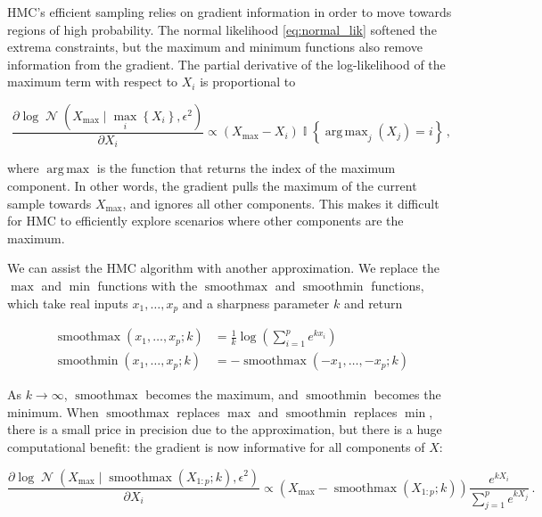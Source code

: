 \documentclass[letter]{article}
\newcommand{\genericdel}[3]{%
      \left#1#3\right#2
    }
\newcommand{\del}[1]{\genericdel(){#1}}
\newcommand{\cbr}[1]{\genericdel\{\}{#1}}
\DeclareMathOperator*{\argmax}{arg\,max}
\DeclareMathOperator{\Ind}{\mathbb{I}}
\DeclareMathOperator{\normal}{\mathcal{N}}
\DeclareMathOperator*{\softmax}{smoothmax}
\DeclareMathOperator*{\softmin}{smoothmin}
\newcommand{\Xmax}{X_{\max}}
\begin{document}
        HMC's efficient sampling relies on gradient information in order to move towards regions of high probability.
The normal likelihood \eqref{eq:normal_lik} softened the extrema constraints,
but the maximum and minimum functions also remove information from the gradient.
The partial derivative of the log-likelihood of the maximum term with respect to \(X_i\) is proportional to

\begin{equation}
\frac{\partial \log \normal\del{\Xmax \mid \max_i\cbr{X_i}, \epsilon^2}}{\partial X_i} \propto \del{\Xmax - X_i} \Ind\cbr{\argmax_j\del{X_j} = i} \,,
\end{equation}

where \(\argmax\) is the function that returns the index of the maximum component.
In other words, the gradient pulls the maximum of the current sample towards \(\Xmax\),
and ignores all other components.
This makes it difficult for HMC to efficiently explore scenarios where other components are the maximum.
    


        We can assist the HMC algorithm with another approximation.
We replace the \(\max\) and \(\min\) functions with the \(\softmax\) and \(\softmin\) functions, which take real inputs \(x_1, \ldots, x_p\) and a sharpness parameter \(k\) and return

\begin{equation}
\begin{split}
    \softmax\del{x_1, \ldots, x_p ; k} &= \frac{1}{k} \log\del{\sum_{i=1}^p e^{kx_i}} \\
    \softmin\del{x_1, \ldots, x_p ; k} &= -\softmax\del{-x_1, \ldots, -x_p; k}
\end{split}
\end{equation}

As \(k \rightarrow \infty\), \(\softmax\) becomes the maximum, and \(\softmin\) becomes the minimum. When \(\softmax\) replaces \(\max\) and \(\softmin\) replaces \(\min\), there is a small price in precision due to the approximation, but there is a huge computational benefit: the gradient is now informative for all components of \(X\):

\begin{equation}
\frac{\partial \log \normal\del{\Xmax \mid \softmax\del{X_{1:p} ; k}, \epsilon^2}}{\partial X_i} \propto \del{\Xmax - \softmax\del{X_{1:p} ; k}} 
        \frac{e^{k X_i}}
             {\sum_{j=1}^p e^{k X_j}} \,.
\end{equation}
\end{document}
